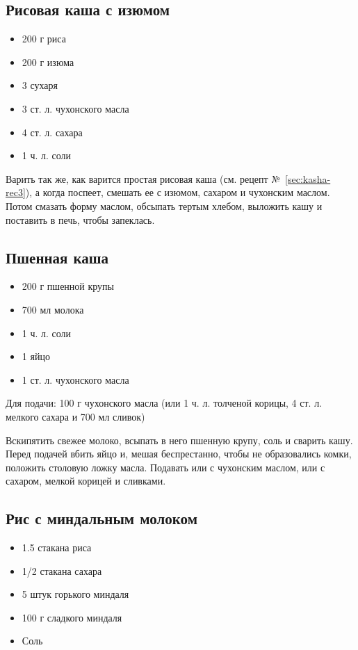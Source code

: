 \subsection{Рисовая каша с изюмом}

\begin{itemize}
	\item 200 г риса
    \item 200 г изюма
    \item 3 сухаря 
    \item 3 ст. л. чухонского масла
    \item 4 ст. л. сахара
    \item 1 ч. л. соли
\end{itemize}

Варить так же, как варится простая рисовая каша (см. рецепт №~\ref{sec:kasha-rec3}), а когда поспеет, смешать ее с изюмом, сахаром и чухонским маслом. Потом смазать форму маслом, обсыпать тертым хлебом, выложить кашу и поставить в печь, чтобы запеклась.

\subsection{Пшенная каша}

\begin{itemize}
	\item 200 г пшенной крупы 
    \item 700 мл молока
    \item 1 ч. л. соли
    \item 1 яйцо 
    \item 1 ст. л. чухонского масла
\end{itemize}

Для подачи: 100 г чухонского масла (или 1 ч. л. толченой корицы, 4 ст. л. мелкого сахара и 700 мл сливок)

Вскипятить свежее молоко, всыпать в него пшенную крупу, соль и сварить кашу. Перед подачей вбить яйцо и, мешая беспрестанно, чтобы не образовались комки, положить столовую ложку масла. Подавать или с чухонским маслом, или с сахаром, мелкой корицей и сливками.

\subsection{Рис с миндальным молоком}

\begin{itemize}
	\item 1.5 стакана риса 
    \item 1/2 стакана сахара 
    \item 5 штук горького миндаля
    \item 100 г сладкого миндаля 
    \item Соль
\end{itemize}

